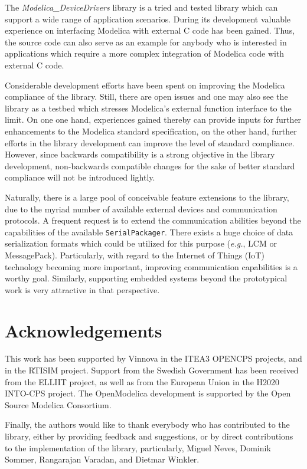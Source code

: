 \documentclass{resources/modelica}
\newcommand{\modelica}[1]{\lstinline[language=modelica]|#1|}
\begin{document}
The \emph{Modelica\_DeviceDrivers} library is a tried and tested library which
can support a wide range of application scenarios. During its development
valuable experience on interfacing Modelica with external C code has been
gained. Thus, the source code can also serve as an example for anybody who is
interested in applications which require a more complex integration of Modelica
code with external C code.

Considerable development efforts have been spent on improving the Modelica
compliance of the library. Still, there are open issues and one may also see the
library as a testbed which stresses Modelica's external function interface
to the limit. On one one hand, experiences gained thereby can provide inputs for
further enhancements to the Modelica standard specification, on the other hand,
further efforts in the library development can improve the level of standard compliance.
However, since backwards compatibility is a strong objective in the library
development, non-backwards compatible changes for the sake of better
standard compliance will not be introduced lightly.

Naturally, there is a large pool of conceivable feature extensions to the
library, due to the myriad number of available external devices and
communication protocols. A frequent request is to extend the communication
abilities beyond the capabilities of the available \mbox{\modelica{SerialPackager}.}
There exists a huge choice of data serialization formats which could be utilized for this
purpose (\textit{e.g.}, LCM or MessagePack). Particularly, with regard to the Internet of Things (IoT) technology
becoming more important, improving communication capabilities is a worthy goal.
Similarly, supporting embedded systems beyond the prototypical work is very attractive in that perspective.

\section*{Acknowledgements}

This work has been supported by Vinnova in the ITEA3 OPENCPS projects,
and in the RTISIM project.
Support from the Swedish Government has been received from the ELLIIT project,
as well as from the European Union in the H2020 INTO-CPS project.
The OpenModelica development is supported by the Open Source Modelica Consortium.

Finally, the authors would like to thank everybody who has contributed to the library,
either by providing feedback and suggestions, or by direct contributions to
the implementation of the library, particularly, Miguel Neves, Dominik Sommer,
Rangarajan Varadan, and Dietmar Winkler.



\end{document}
